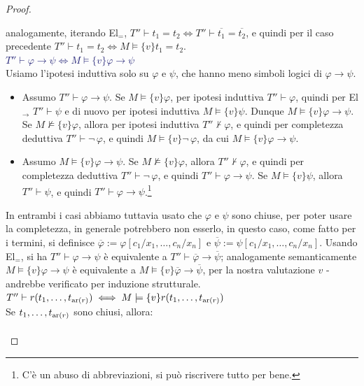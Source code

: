 \begin{proof}
\begin{enumerate}
        analogamente, iterando El$_=$, $T'' \vdash t_1 = t_2 \iff T'' \vdash \overline{t_1} = \overline{t_2}$, e quindi per il caso precedente $T'' \vdash t_1 = t_2 \iff M \models \{v\}t_1 = t_2$.\\
        \textcolor{MidnightBlue}{$T'' \vdash \varphi \to \psi \iff M \models \{v\}\varphi \to \psi$}\\
        Usiamo l'ipotesi induttiva solo su $\varphi$ e $\psi$, che hanno meno simboli logici di $\varphi \to \psi$.
        \begin{itemize}
            \item[$\boxed{\implies}$] Assumo $T'' \vdash \varphi \to \psi$. Se $M \models \{v\}\varphi$, per ipotesi induttiva $T'' \vdash \varphi$, quindi per El$_\to$ $T'' \vdash \psi$ e di nuovo per ipotesi induttiva $M \models \{v\}\psi$. Dunque $M \models \{v\}\varphi \to \psi$.
            Se $M \not\models \{v\}\varphi$, allora per ipotesi induttiva $T'' \nvdash \varphi$, e quindi per completezza deduttiva $T'' \vdash \neg \,\varphi$, e quindi $M \models \{v\}\neg \,\varphi$, da cui $M \models \{v\}\varphi \to \psi$.
            \item[$\boxed{\impliedby}$] Assumo $M \models \{v\}\varphi \to \psi$. Se $M\not\models \{v\}\varphi$, allora $T'' \nvdash \varphi$, e quindi per completezza deduttiva $T'' \vdash \neg \,\varphi$, e quindi $T'' \vdash \varphi \to \psi$. 
            Se $M \models \{v\}\psi$, allora $T'' \vdash \psi$, e quindi $T'' \vdash \varphi \to \psi$.\footnote{C'è un abuso di abbreviazioni, si può riscrivere tutto per bene.}
        \end{itemize}
        In entrambi i casi abbiamo tuttavia usato che $\varphi$ e $\psi$ sono chiuse, per poter usare la completezza, in generale potrebbero non esserlo, in questo caso, come fatto per i termini, si definisce $\overline\varphi := \varphi[c_1/x_1,\ldots,c_n/x_n]$ e $\overline\psi := \psi[c_1/x_1,\ldots,c_n/x_n]$.
        Usando El$_=$, si ha $T'' \vdash \varphi \to \psi$ è equivalente a $T'' \vdash \overline\varphi \to \overline\psi$;
        analogamente semanticamente $M \models \{v\}\varphi \to \psi$ è equivalente a $M \models \{v\}\overline\varphi \to \overline\psi$, per la nostra valutazione $v$ - andrebbe verificato per induzione strutturale.\\
        \textcolor{MidnightBlue}{$T'' \vdash r(t_1,\ldots,t_{\operatorname{ar}(r)}) \iff M \models \{v\}r(t_1,\ldots,t_{\operatorname{ar}(r)})$}\\
        Se $t_1,\ldots,t_{\operatorname{ar}(r)}$ sono chiusi, allora:
        \begin{align*}

\end{align*}
\end{enumerate}
\end{proof}
